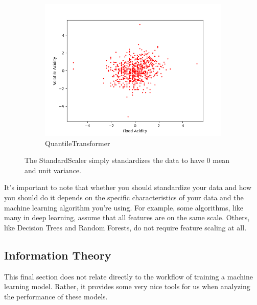 \documentclass{article}
\theoremstyle{definition}
\begin{document}
\begin{figure}[hbt!]
\begin{subfigure}[b]{0.32\textwidth}
            \centering
                \includegraphics[width=\textwidth]{Standardize/Quantile_Scaler.png}
                \caption{QuantileTransformer}
                \label{fig:quantile_transformer}
            \end{subfigure}
            
            \caption{The StandardScaler simply standardizes the data to have $0$ mean and unit variance.}
            \label{Scalers}
        \end{figure}

    It's important to note that whether you should standardize your data and how you should do it depends on the specific characteristics of your data and the machine learning algorithm you're using. For example, some algorithms, like many in deep learning, assume that all features are on the same scale. Others, like Decision Trees and Random Forests, do not require feature scaling at all. 

  \subsection{Information Theory}

    This final section does not relate directly to the workflow of training a machine learning model. Rather, it provides some very nice tools for us when analyzing the performance of these models. 
\end{document}
